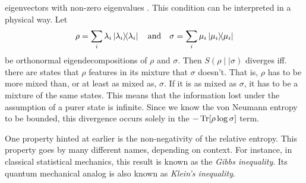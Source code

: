 eigenvectors with non-zero eigenvalues
\cite{leditzkyRelativeEntropiesTheir2016,schumacherRelativeEntropyQuantum2000}.
This condition can be interpreted in a physical way. Let
\[
  \rho = \sum_i \lambda_i \dyad{\lambda_i} \quad{\text{and}} \quad
  \sigma = \sum_i \mu_i \dyad{\mu_i}
\]
be orthonormal eigendecompositions of $\rho$ and $\sigma$.
Then $S(\rho\mid\mid\sigma)$ diverges iff. there are states that $\rho$
features in its mixture that $\sigma$ doesn't. That is, $\rho$ has to be more
mixed than, or at least as mixed as, $\sigma$. If it is as mixed as
$\sigma$, it has to be a mixture of the same states. This means that the
information lost under the assumption of a purer state is infinite.
Since we know the von Neumann entropy to be bounded, this divergence occurs
solely in the $-\Tr[\rho\log\sigma]$ term. 

One property hinted at earlier is the non-negativity of the relative entropy.
This property goes by many different names, depending on context. For instance,
in classical statistical mechanics, this result is known as the \emph{Gibbs
inequality}. Its quantum mechanical analog is also known as \emph{Klein's
inequality}.
